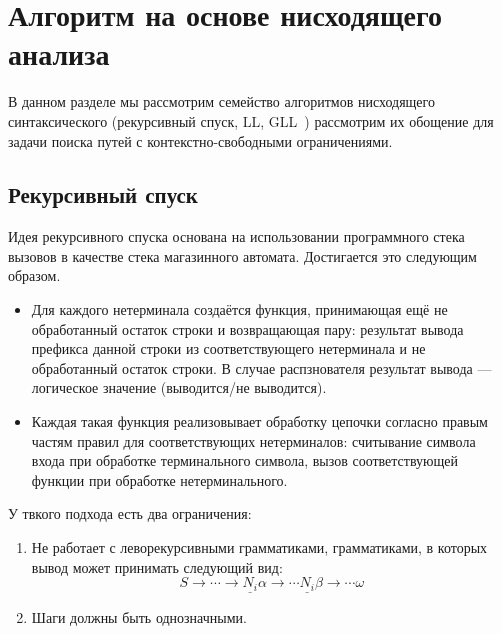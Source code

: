 \chapter{Алгоритм на основе нисходящего анализа}

В данном разделе мы рассмотрим семейство алгоритмов нисходящего синтаксического (рекурсивный спуск, LL, GLL~\cite{Scott:2010:GP:1860132.1860320,10.1007/978-3-662-46663-6_5}) рассмотрим их обощение для задачи поиска путей с контекстно-свободными ограничениями.


\section{Рекурсивный спуск}

Идея рекурсивного спуска основана на использовании программного стека вызовов в качестве стека магазинного автомата. Достигается это следующим образом.
\begin{itemize}
  \item Для каждого нетерминала создаётся функция, принимающая ещё не обработанный остаток строки и возвращающая пару: результат вывода префикса данной строки из соответствующего нетерминала и не обработанный остаток строки. В случае распзнователя результат вывода --- логическое значение (выводится/не выводится).
  \item Каждая такая функция реализовывает обработку цепочки согласно правым частям правил для соответствующих нетерминалов: считывание символа входа при обработке терминального символа, вызов соответствующей функции при обработке нетерминального.
\end{itemize}

У твкого подхода есть два ограничения:
\begin{enumerate}
  \item Не работает с леворекурсивными грамматиками, грамматиками, в которых вывод может принимать следующий вид:
  $$
  S \to \cdots \to \underline{N_i} \alpha \to \cdots \underline{N_i} \beta \to \cdots \omega
  $$
  \item Шаги должны быть однозначными.
\end{enumerate}

